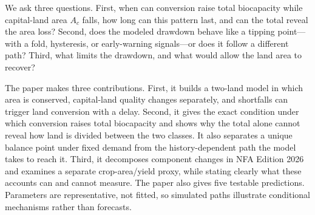 \documentclass[preprint,12pt,authoryear]{elsarticle}
\begin{document}
We ask three questions. First, when can conversion raise total biocapacity while capital-land area $A_c$ falls, how long can this pattern last, and can the total reveal the area loss? Second, does the modeled drawdown behave like a tipping point—with a fold, hysteresis, or early-warning signals—or does it follow a different path? Third, what limits the drawdown, and what would allow the land area to recover?

The paper makes three contributions. First, it builds a two-land model in which area is conserved, capital-land quality changes separately, and shortfalls can trigger land conversion with a delay. Second, it gives the exact condition under which conversion raises total biocapacity and shows why the total alone cannot reveal how land is divided between the two classes. It also separates a unique balance point under fixed demand from the history-dependent path the model takes to reach it. Third, it decomposes component changes in NFA Edition 2026 and examines a separate crop-area/yield proxy, while stating clearly what these accounts can and cannot measure. The paper also gives five testable predictions. Parameters are representative, not fitted, so simulated paths illustrate conditional mechanisms rather than forecasts.
\end{document}
